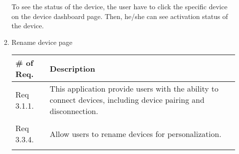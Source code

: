 \begin{enumerate}[label=\arabic*.]
\begin{enumerate}[label*={\arabic*.},ref=\theenumi.\arabic*]
                    To see the status of the device, the user have to click the specific device on the device dashboard page. Then, he/she can see activation status of the device. \\
                    \newpage
              \item Rename device page
                    \begin{table}[H]
                        \center
                        \begin{tabular}{m{1.4cm} m{5.5cm}}
                            \toprule
                            \# of Req. & Description                                                                                                     \\
                            \midrule
                            Req 3.1.1. & This application provide users with the ability to connect devices, including device pairing and disconnection. \\\\
                            Req 3.3.4. & Allow users to rename devices for personalization.                                                              \\\\
                            \bottomrule
                        \end{tabular}
                    \end{table}


\end{enumerate}
\end{enumerate}

